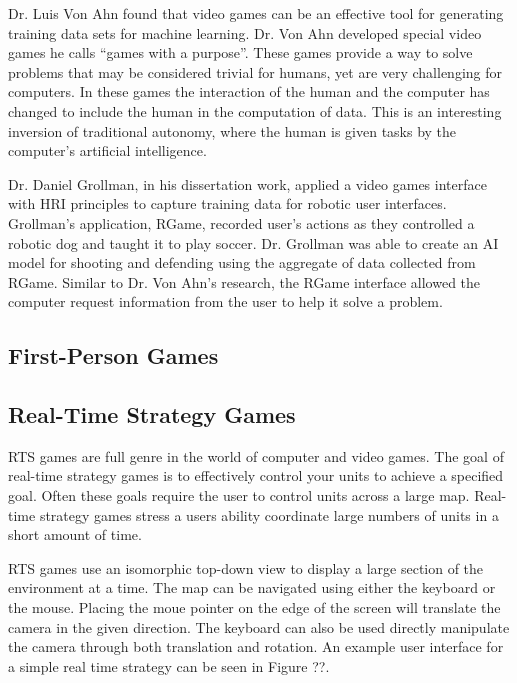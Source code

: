 Dr. Luis Von Ahn found that video games can be an effective tool for generating training data sets for machine learning. \cite{GWAP} Dr. Von Ahn developed special video games he calls ``games with a purpose''.  These games provide a way to solve problems that may be considered trivial for humans, yet are very challenging for computers. In these games the interaction of the human and the computer has changed to include the human in the computation of data. This is an interesting inversion of traditional autonomy, where the human is given tasks by the computer's artificial intelligence.


Dr. Daniel Grollman, in his dissertation work, applied a video games interface with HRI principles to capture training data for robotic user interfaces. \cite{Grollman} Grollman's application, RGame, recorded user’s actions as they controlled a robotic dog and taught it to play soccer. Dr. Grollman was able to create an AI model for shooting and defending using the aggregate of data collected from RGame. Similar to Dr. Von Ahn's research, the RGame interface allowed the computer request information from the user to help it solve a problem.

\subsection{First-Person Games} %
\label{sub:first_person_games}


\subsection{Real-Time Strategy Games} %
\label{sub:RTS_games}

RTS games are full genre in the world of computer and video games. The goal of real-time strategy games is to effectively control your units to achieve a specified goal. Often these goals require the user to control units across a large  map. Real-time strategy games stress a users ability coordinate large numbers of units in a short amount of time. 

RTS games use an isomorphic top-down view to display a large section of the environment at a time. The map can be navigated using either the keyboard or the mouse. Placing the moue pointer on the edge of the screen will translate the camera in the given direction. The keyboard can also be used directly manipulate the camera through both translation and rotation. An example user interface for a simple real time strategy can be seen in Figure ??. 


